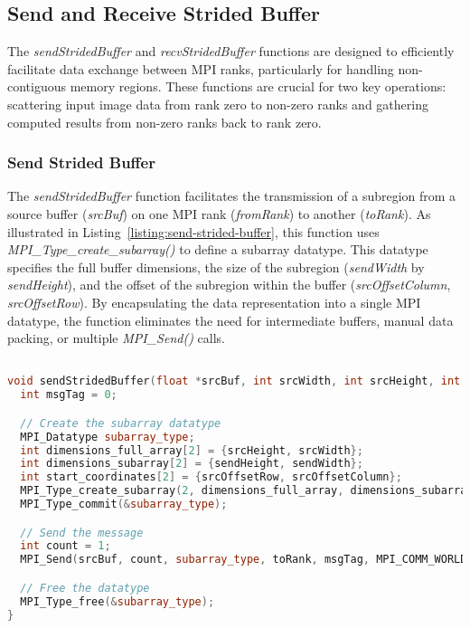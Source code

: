 \subsection{Send and Receive Strided Buffer}
\label{subsec:send-and-receive-strided-buffer}

The \textit{sendStridedBuffer} and \textit{recvStridedBuffer} functions are designed to efficiently facilitate data exchange between MPI ranks, particularly for handling non-contiguous memory regions. These functions are crucial for two key operations: scattering input image data from rank zero to non-zero ranks and gathering computed results from non-zero ranks back to rank zero.

\subsubsection{Send Strided Buffer}
\label{subsubsec:send-strided-buffer}

The \textit{sendStridedBuffer} function facilitates the transmission of a subregion from a source buffer (\textit{srcBuf}) on one MPI rank (\textit{fromRank}) to another (\textit{toRank}). As illustrated in Listing~\ref{listing:send-strided-buffer}, this function uses \textit{MPI\_Type\_create\_subarray()} to define a subarray datatype. This datatype specifies the full buffer dimensions, the size of the subregion (\textit{sendWidth} by \textit{sendHeight}), and the offset of the subregion within the buffer (\textit{srcOffsetColumn}, \textit{srcOffsetRow}). By encapsulating the data representation into a single MPI datatype, the function eliminates the need for intermediate buffers, manual data packing, or multiple \textit{MPI\_Send()} calls.

\begin{lstlisting}[caption={\textbf{Implementation of the send strided buffer function.}},label={listing:send-strided-buffer},float=htbp,style=mystyle,language=C++]

void sendStridedBuffer(float *srcBuf, int srcWidth, int srcHeight, int srcOffsetColumn, int srcOffsetRow, int sendWidth, int sendHeight, int fromRank, int toRank) {
  int msgTag = 0;

  // Create the subarray datatype
  MPI_Datatype subarray_type;
  int dimensions_full_array[2] = {srcHeight, srcWidth};
  int dimensions_subarray[2] = {sendHeight, sendWidth};
  int start_coordinates[2] = {srcOffsetRow, srcOffsetColumn};
  MPI_Type_create_subarray(2, dimensions_full_array, dimensions_subarray, start_coordinates, MPI_ORDER_C, MPI_FLOAT, &subarray_type);
  MPI_Type_commit(&subarray_type);

  // Send the message
  int count = 1;
  MPI_Send(srcBuf, count, subarray_type, toRank, msgTag, MPI_COMM_WORLD);

  // Free the datatype
  MPI_Type_free(&subarray_type);
}

\end{lstlisting}
\FloatBarrier

